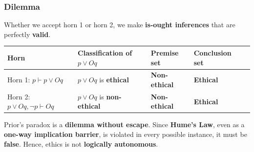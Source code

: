 \documentclass[11pt]{article}
\begin{document}
\subsubsection{Dilemma}
\label{sec:org04e6055}
Whether we accept horn 1 or horn 2, we make \textbf{is-ought inferences} that are perfectly \textbf{valid}.
\begin{center}
\begin{tabularx}{\textwidth}{|X|X|X|X|X|}
\hline
Horn & Classification of \(p \vee Oq\) & Premise set & Conclusion set\\
\hline
Horn 1: \(p \vdash p \vee Oq\) & \(p \vee Oq\) is \textbf{ethical} & \textbf{Non-ethical} & \textbf{Ethical}\\
\hline
Horn 2: \(p \vee Oq, \neg p \vdash Oq\) & \(p \vee Oq\) is \textbf{non-ethical} & \textbf{Non-ethical} & \textbf{Ethical}\\
\hline
\end{tabularx}
\end{center}
Prior's paradox is a \textbf{dilemma without escape}. Since \textbf{Hume's Law}, even as a \textbf{one-way implication barrier}, is violated in every possible instance, it must be \textbf{false}. Hence, ethics is not \textbf{logically autonomous}.

 \newpage
\end{document}
